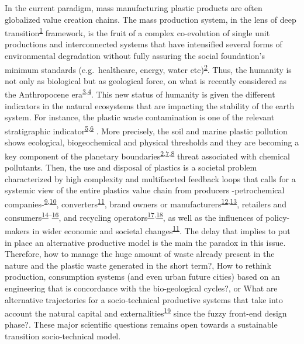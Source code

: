 \documentclass[
  12pt,
  a4paperpaper,
  onecolumn]{article}
\begin{document}
In the current paradigm, mass manufacturing plastic products are often
globalized value creation chains. The mass production system, in the
lens of deep
transition\textsuperscript{\protect\hyperlink{ref-kanger2022}{1}}
framework, is the fruit of a complex co-evolution of single unit
productions and interconnected systems that have intensified several
forms of environmental degradation without fully assuring the social
foundation's minimum standards (e.g.~healthcare, energy, water
etc)\textsuperscript{\protect\hyperlink{ref-raworth2017}{2}}. Thus, the
humanity is not only as biological but as geological force, on what is
recently considered as the Anthropocene
era\textsuperscript{\protect\hyperlink{ref-steffen2018}{3},\protect\hyperlink{ref-steffen2011}{4}}.
This new status of humanity is given the different indicators in the
natural ecosystems that are impacting the stability of the earth system.
For instance, the plastic waste contamination is one of the relevant
stratigraphic
indicator\textsuperscript{\protect\hyperlink{ref-porta2021}{5},\protect\hyperlink{ref-de-la-torre2021}{6}
}. More precisely, the soil and marine plastic pollution shows
ecological, biogeochemical and physical thresholds and they are becoming
a key component of the planetary
boundaries\textsuperscript{\protect\hyperlink{ref-raworth2017}{2},\protect\hyperlink{ref-ONeill2018}{7},\protect\hyperlink{ref-Rockstrom2009}{8}}
threat associated with chemical pollutants. Then, the use and disposal
of plastics is a societal problem characterized by high complexity and
multifaceted feedback loops that calls for a systemic view of the entire
plastics value chain from producers -petrochemical
companies-\textsuperscript{\protect\hyperlink{ref-Iles2013}{9},\protect\hyperlink{ref-DeVargasMores2018}{10}},
converters\textsuperscript{\protect\hyperlink{ref-Paletta2019}{11}},
brand owners or
manufacturers\textsuperscript{\protect\hyperlink{ref-Gong2020}{12},\protect\hyperlink{ref-Ma2020}{13}},
retailers and
consumers\textsuperscript{\protect\hyperlink{ref-Confente2020}{14}--\protect\hyperlink{ref-Filho2021}{16}},
and recycling
operators\textsuperscript{\protect\hyperlink{ref-Huysveld2019}{17},\protect\hyperlink{ref-Pazienza2020}{18}},
as well as the influences of policy-makers in wider economic and
societal
changes\textsuperscript{\protect\hyperlink{ref-Paletta2019}{11}}. The
delay that implies to put in place an alternative productive model is
the main the paradox in this issue. Therefore, how to manage the huge
amount of waste already present in the nature and the plastic waste
generated in the short term?, How to rethink production, consumption
systems (and even urban future cities) based on an engineering that is
concordance with the bio-geological cycles?, or What are alternative
trajectories for a socio-technical productive systems that take into
account the natural capital and
externalities\textsuperscript{\protect\hyperlink{ref-zhen2021}{19}}
since the fuzzy front-end design phase?. These major scientific
questions remains open towards a sustainable transition socio-technical
model.
\end{document}
